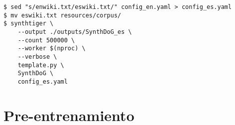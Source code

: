 \documentclass[../main.tex]{subfiles}
\begin{document}
\begin{verbatim}
$ sed "s/enwiki.txt/eswiki.txt/" config_en.yaml > config_es.yaml
$ mv eswiki.txt resources/corpus/
$ synthtiger \
	--output ./outputs/SynthDoG_es \
	--count 500000 \
	--worker $(nproc) \
	--verbose \
	template.py \
	SynthDoG \
	config_es.yaml
\end{verbatim}

\section{Pre-entrenamiento}


\end{document}
